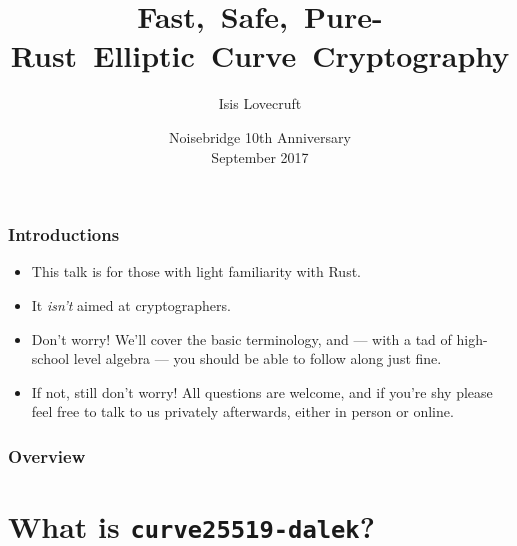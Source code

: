 \documentclass[xetex,aspectratio=169]{beamer}
\title{\mbox{Fast, Safe, Pure-Rust Elliptic Curve Cryptography}}
\author{Isis Lovecruft} %
\date{Noisebridge 10th Anniversary \\ September 2017}
\begin{document}
\maketitle

\begin{frame}
  \frametitle{Introductions}

  \begin{itemize}
    \item<2-> This talk is for those with light familiarity with Rust.
    \item<3-> It \emph{isn't} aimed at cryptographers.
    \item<4-> Don't worry! We'll cover the basic terminology, and --- with a tad
      of high-school level algebra --- you should be able to follow along just
      fine.
    \item<5-> If not, still don't worry! All questions are welcome, and if
      you're shy please feel free to talk to us privately afterwards, either in
      person or online.
  \end{itemize}
\end{frame}

\begin{frame}
  \frametitle{Overview}
  \tableofcontents
\end{frame}

\section{What is \texttt{curve25519-dalek}?}
\end{document}
